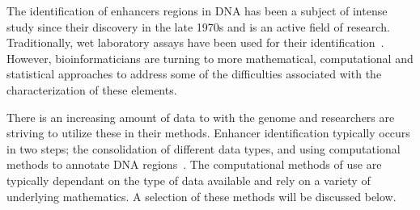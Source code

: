 
        The identification of enhancers regions in DNA has been a subject of intense study since their discovery in the late 1970s and is an active field of research. Traditionally, wet laboratory assays have been used for their identification~\cite{rosenthal198772}. However, bioinformaticians are turning to more mathematical, computational and statistical approaches to address some of the difficulties associated with the characterization of these elements. 
        
        There is an increasing amount of data to with the genome and researchers are striving to utilize these in their methods. Enhancer identification typically occurs in two steps; the consolidation of different data types, and using computational methods to annotate DNA regions~\cite{kleftogiannis2015progress}. The computational methods of use are typically dependant on the type of data available and rely on a variety of underlying mathematics. A selection of these methods will be discussed below.
        
        
        



